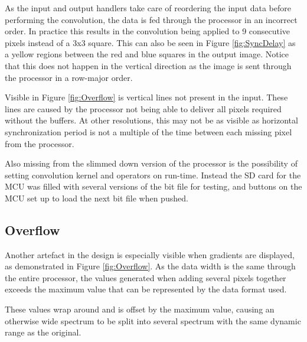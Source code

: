 As the input and output handlers take care of reordering the input data before performing the convolution, the data is fed through the processor in an incorrect order.
In practice this results in the convolution being applied to 9 consecutive pixels instead of a 3x3 square.
This can also be seen in Figure \ref{fig:SyncDelay} as a yellow regions between the red and blue squares in the output image.
Notice that this does not happen in the vertical direction as the image is sent through the processor in a row-major order.

Visible in Figure \ref{fig:Overflow} is vertical lines not present in the input.
These lines are caused by the processor not being able to deliver all pixels required without the buffers.
At other resolutions, this may not be as visible as horizontal synchronization period is not a multiple of the time between each missing pixel from the processor.

Also missing from the slimmed down version of the processor is the possibility of setting convolution kernel and operators on run-time.
Instead the SD card for the MCU was filled with several versions of the bit file for testing, and buttons on the MCU set up to load the next bit file when pushed.

\subsection{Overflow}
Another artefact in the design is especially visible when gradients are displayed, as demonstrated in Figure \ref{fig:Overflow}.
As the data width is the same through the entire processor, the values generated when adding several pixels together exceeds the maximum value that can be represented by the data format used.

These values wrap around and is offset by the maximum value, causing an otherwise wide spectrum to be split into several spectrum with the same dynamic range as the original.

